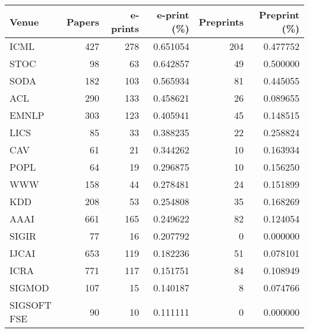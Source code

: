 \begin{tabular}{lrrrrr}
\toprule
       Venue &  Papers &  e-prints &  e-print (\%) &  Preprints &  Preprint (\%) \\
\midrule
        ICML &     427 &       278 &     0.651054 &        204 &      0.477752 \\
        STOC &      98 &        63 &     0.642857 &         49 &      0.500000 \\
        SODA &     182 &       103 &     0.565934 &         81 &      0.445055 \\
         ACL &     290 &       133 &     0.458621 &         26 &      0.089655 \\
       EMNLP &     303 &       123 &     0.405941 &         45 &      0.148515 \\
        LICS &      85 &        33 &     0.388235 &         22 &      0.258824 \\
         CAV &      61 &        21 &     0.344262 &         10 &      0.163934 \\
        POPL &      64 &        19 &     0.296875 &         10 &      0.156250 \\
         WWW &     158 &        44 &     0.278481 &         24 &      0.151899 \\
         KDD &     208 &        53 &     0.254808 &         35 &      0.168269 \\
        AAAI &     661 &       165 &     0.249622 &         82 &      0.124054 \\
       SIGIR &      77 &        16 &     0.207792 &          0 &      0.000000 \\
       IJCAI &     653 &       119 &     0.182236 &         51 &      0.078101 \\
        ICRA &     771 &       117 &     0.151751 &         84 &      0.108949 \\
      SIGMOD &     107 &        15 &     0.140187 &          8 &      0.074766 \\
 SIGSOFT FSE &      90 &        10 &     0.111111 &          0 &      0.000000 \\
\bottomrule
\end{tabular}
